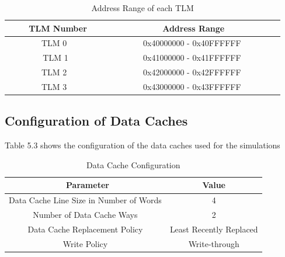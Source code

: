 \documentclass{listhesis}
\begin{document}
\begin{table}[h!]
\begin{center}
 \begin{tabular}{|| c | c ||} 
 \hline
 \ \textbf{TLM Number} & \textbf{Address Range}  \\ [0.5 ex] 
 \hline\hline
 \ \ \ \ \ \ \ \ TLM 0 \ \ \ \ \ \ \ \ & \ \ \ \ \ \ \ \ 0x40000000 - 0x40FFFFFF \ \ \ \ \ \ \ \ \\ 
 \hline
 \ \ \ \ \ \ \ \ TLM 1\ \ \ \ \ \ \ \ & \ \ \ \ \ \ \ \ 0x41000000 - 0x41FFFFFF  \ \ \ \ \ \ \ \ \\
 \hline
 \ \ \ \ \ \ \ \ TLM 2 \ \ \ \ \ \ \ \ & \ \ \ \ \ \ \ \ 0x42000000 - 0x42FFFFFF  \ \ \ \ \ \ \ \  \\
 \hline
  \ \ \ \ \ \ \ \ TLM 3 \ \ \ \ \ \ \ \ & \ \ \ \ \ \ \ \ 0x43000000 - 0x43FFFFFF  \ \ \ \ \ \ \ \  \\
  \hline
\end{tabular}
 \caption{Address Range of each TLM}
 \label{table:addressTLM}
\end{center}
\end{table}

\subsection{Configuration of Data Caches}
Table 5.3 shows the configuration of the data caches used for the simulations
\begin{table}[h!]
\begin{center}
 \begin{tabular}{|| c | c ||} 
 \hline
 \ \textbf{Parameter} & \textbf{Value}  \\ [0.5 ex] 
 \hline\hline
  Data Cache Line Size in Number of Words &  4  \\
  \hline
  Number of Data Cache Ways &  2  \\
  \hline
  Data Cache Replacement Policy  & Least Recently Replaced  \\ 
 \hline
  Write Policy  &  Write-through  \\
  \hline
\end{tabular}
 \caption{Data Cache Configuration}
 \label{table:properties}
\end{center}
\end{table}
\end{document}
